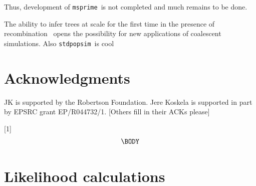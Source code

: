 \documentclass{article}
\newcommand{\msprime}[0]{\texttt{msprime}}
\newcommand{\stdpopsim}[0]{\texttt{stdpopsim}}
\begin{document}
Thus, development of \msprime\ is not completed and much remains
to be done.


The ability to infer trees at scale for the first time
in the presence of
recombination~\citep{harris2019database,kelleher2019inferring,
speidel2019method,tang2019genealogy}
opens the possibility for new applications of coalescent simulations.
Also \stdpopsim\ is cool~\citep{adrion2020community}

\section{Acknowledgments}
JK is supported by the Robertson Foundation.
Jere Koskela is supported in part by EPSRC grant EP/R044732/1.
[Others fill in their ACKs please]





 \newcommand{\be}{\begin{equation}}
 \newcommand{\ee}{\end{equation}}
 \newcommand{\bd}{\begin{displaymath}}
 \newcommand{\ed}{\end{displaymath}}
\newcommand{\IN}{\ensuremath{\mathds{N}}}%
\newcommand{\EE}[1]{\ensuremath{\mathds{E}\left[ #1 \right]}}%
\newcommand{\one}[1]{\ensuremath{\mathds{1}_{\left\{ #1 \right\}}}}%
\newcommand{\prb}[1]{\ensuremath{\mathds{P}\left( #1 \right) } }%

[1]{%
\begin{equation}
\label{#1}
\begin{split}
  \BODY
\end{split}\end{equation}
}

\setcounter{secnumdepth}{2} %

\appendix

\label{app-likelihoods}
\section{Likelihood calculations}
\end{document}
